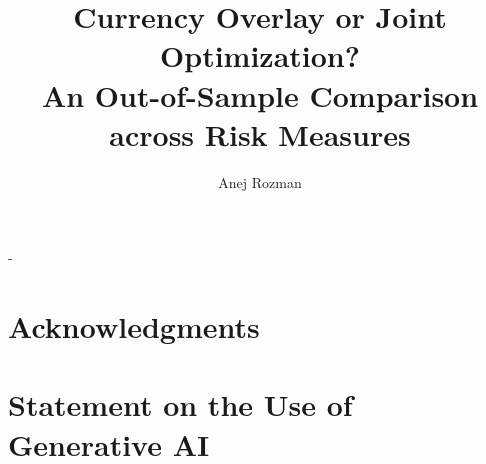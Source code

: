 \documentclass[11pt,a4paper,oneside]{memoir}
\title{Currency Overlay or Joint Optimization?\\ An Out-of-Sample Comparison across Risk Measures}
\author{Anej Rozman}
\date{}
\theoremstyle{nonumberplain}
\theoremstyle{plain}
\begin{document}
\frontmatter  

\begin{titlingpage} 
  \calccentering{\unitlength}
  \begin{adjustwidth*}{\unitlength-24pt}{-\unitlength-24pt}  
    \maketitle 
  \end{adjustwidth*}
\end{titlingpage}

\chapter*{Acknowledgments}

\pagebreak 

  

\cleartorecto 
\tableofcontents*
\mainmatter

\newpage 







 
\appendix
\appendixpage








\backmatter
 



\chapter{Statement on the Use of Generative AI}


% 
\end{document}
